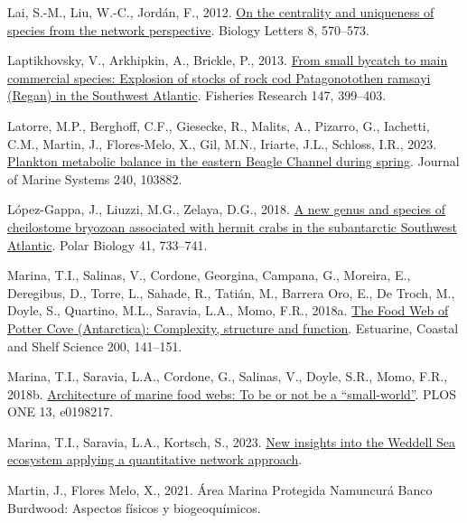 \documentclass[preprint, 3p,
authoryear]{elsarticle} %
\newlength{\cslhangindent}
\newlength{\cslentryspacingunit} %
\newenvironment{CSLReferences}[2] %
 {%
  \setlength{\parindent}{0pt}
  \ifodd #1
  \let\oldpar\par
  \def\par{\hangindent=\cslhangindent\oldpar}
  \fi
  \setlength{\parskip}{#2\cslentryspacingunit}
 }%
 {}
\begin{document}
\begin{CSLReferences}{1}{0}
\leavevmode{}%
Lai, S.-M., Liu, W.-C., Jordán, F., 2012.
\href{https://doi.org/10.1098/rsbl.2011.1167}{On the centrality and
uniqueness of species from the network perspective}. Biology Letters 8,
570--573.

\leavevmode{}%
Laptikhovsky, V., Arkhipkin, A., Brickle, P., 2013.
\href{https://doi.org/10.1016/j.fishres.2013.05.006}{From small bycatch
to main commercial species: {Explosion} of stocks of rock cod
{Patagonotothen} ramsayi ({Regan}) in the {Southwest Atlantic}}.
Fisheries Research 147, 399--403.

\leavevmode{}%
Latorre, M.P., Berghoff, C.F., Giesecke, R., Malits, A., Pizarro, G.,
Iachetti, C.M., Martin, J., Flores-Melo, X., Gil, M.N., Iriarte, J.L.,
Schloss, I.R., 2023.
\href{https://doi.org/10.1016/j.jmarsys.2023.103882}{Plankton metabolic
balance in the eastern {Beagle Channel} during spring}. Journal of
Marine Systems 240, 103882.

\leavevmode{}%
López-Gappa, J., Liuzzi, M.G., Zelaya, D.G., 2018.
\href{https://doi.org/10.1007/s00300-017-2234-9}{A new genus and species
of cheilostome bryozoan associated with hermit crabs in the subantarctic
{Southwest Atlantic}}. Polar Biology 41, 733--741.

\leavevmode{}%
Marina, T.I., Salinas, V., Cordone, Georgina, Campana, G., Moreira, E.,
Deregibus, D., Torre, L., Sahade, R., Tatián, M., Barrera Oro, E., De
Troch, M., Doyle, S., Quartino, M.L., Saravia, L.A., Momo, F.R., 2018a.
\href{https://doi.org/10.1016/j.ecss.2017.10.015}{The {Food Web} of
{Potter Cove} ({Antarctica}): Complexity, structure and function}.
Estuarine, Coastal and Shelf Science 200, 141--151.

\leavevmode{}%
Marina, T.I., Saravia, L.A., Cordone, G., Salinas, V., Doyle, S.R.,
Momo, F.R., 2018b.
\href{https://doi.org/10.1371/journal.pone.0198217}{Architecture of
marine food webs: {To} be or not be a {``small-world''}}. PLOS ONE 13,
e0198217.

\leavevmode{}%
Marina, T.I., Saravia, L.A., Kortsch, S., 2023.
\href{https://doi.org/10.5194/egusphere-2022-1518}{New insights into the
{Weddell Sea} ecosystem applying a quantitative network approach}.

\leavevmode{}%
Martin, J., Flores Melo, X., 2021. {Área Marina Protegida Namuncurá
Banco Burdwood: Aspectos físicos y biogeoquímicos}.


\end{CSLReferences}
\end{document}
